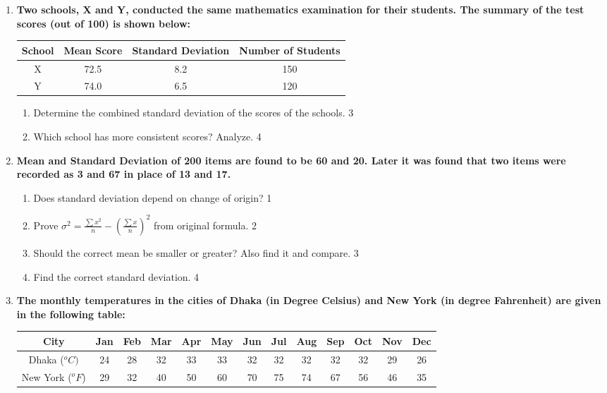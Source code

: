 \documentclass[a4paper,oneside]{book}
\begin{document}
\begin{enumerate}
  \item 
  \textbf{Two schools, X and Y, conducted the same mathematics examination for their students. The summary of the test scores (out of 100) is shown below:}

\begin{table}[h]
\centering
\begin{tabular}{c|ccc}
School & Mean Score & Standard Deviation & Number of Students \\ \hline
X      & 72.5       & 8.2                & 150                \\ 
Y      & 74.0       & 6.5                & 120               
\end{tabular}
\end{table}

  \begin{enumerate}
    \item  
	Determine the combined standard deviation of the scores of the schools. \hfill 3
    \item
	Which school has more consistent scores? Analyze. \hfill 4
  \end{enumerate}

 \item
	  \textbf{Mean and Standard Deviation of 200 items are found to be 60 and 20. Later it was found that two items were recorded as 3 and 67 in place of 13 and 17.} 
  
  \begin{enumerate}
    \item
	Does standard deviation depend on change of origin? \hfill 1
    \item
	Prove $\displaystyle \sigma^2 = \frac{\sum x^2}n -(\frac{\sum x}{n})^2$ from original formula. \hfill 2
    \item  
	Should the correct mean be smaller or greater? Also find it and compare.  \hfill 3
    \item
	Find the correct standard deviation. \hfill 4
  \end{enumerate}
  
     \item
  \textbf{The monthly temperatures in the cities of Dhaka (in Degree Celsius) and New York (in degree Fahrenheit) are given in the following table:}
  
  
\begin{table}[H]
\centering
\begin{tabular}{|c|c|c|c|c|c|c|c|c|c|c|c|c|}
\hline
City             & Jan  & Feb  & Mar  & Apr  & May  & Jun  & Jul  & Aug  & Sep  & Oct  & Nov  & Dec  \\ \hline
Dhaka ($^o C)$   & 24 & 28 & 32 & 33 & 33 & 32 & 32 & 32 & 32 & 32 & 29 & 26 \\ \hline
New York ($^oF$) & 29   & 32   & 40   & 50   & 60   & 70   & 75   & 74   & 67   & 56   & 46   & 35   \\ \hline
\end{tabular}
\end{table}


\end{enumerate}
\end{document}
